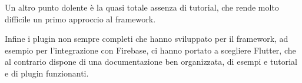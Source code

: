 Un altro punto dolente è la quasi totale assenza di tutorial, che rende molto difficile un primo approccio al framework.

Infine i plugin non sempre completi che hanno sviluppato per il framework, ad esempio per l'integrazione con Firebase, ci hanno portato a scegliere Flutter, che al contrario dispone di una documentazione ben organizzata, di esempi e tutorial e di plugin funzionanti.